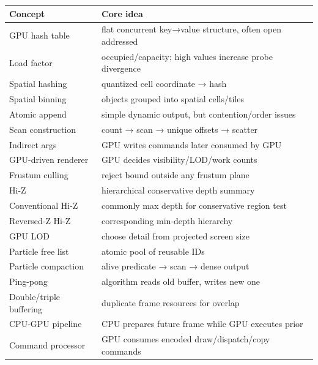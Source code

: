{\def\LTcaptype{none} %
\begin{longtable}[]{@{}
  >{\raggedright\arraybackslash}p{}
  >{\raggedright\arraybackslash}p{}@{}}
\toprule\noalign{}
\begin{minipage}[b]{\linewidth}\raggedright
Concept
\end{minipage} & \begin{minipage}[b]{\linewidth}\raggedright
Core idea
\end{minipage} \\
\midrule\noalign{}
\endhead
\bottomrule\noalign{}
\endlastfoot
GPU hash table & flat concurrent key→value structure, often open addressed \\
Load factor & occupied/capacity; high values increase probe divergence \\
Spatial hashing & quantized cell coordinate → hash \\
Spatial binning & objects grouped into spatial cells/tiles \\
Atomic append & simple dynamic output, but contention/order issues \\
Scan construction & count → scan → unique offsets → scatter \\
Indirect args & GPU writes commands later consumed by GPU \\
GPU-driven renderer & GPU decides visibility/LOD/work counts \\
Frustum culling & reject bound outside any frustum plane \\
Hi-Z & hierarchical conservative depth summary \\
Conventional Hi-Z & commonly max depth for conservative region test \\
Reversed-Z Hi-Z & corresponding min-depth hierarchy \\
GPU LOD & choose detail from projected screen size \\
Particle free list & atomic pool of reusable IDs \\
Particle compaction & alive predicate → scan → dense output \\
Ping-pong & algorithm reads old buffer, writes new one \\
Double/triple buffering & duplicate frame resources for overlap \\
CPU-GPU pipeline & CPU prepares future frame while GPU executes prior \\
Command processor & GPU consumes encoded draw/dispatch/copy commands \\

\end{longtable}}
